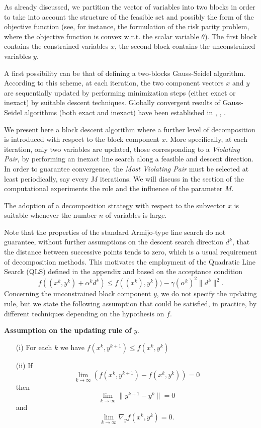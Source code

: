 As already discussed, we partition the vector of variables into two blocks in order to take into account
the structure of the feasible set and possibly the form of the objective function (see, for instance,
the formulation of the risk parity problem, where the objective function is convex w.r.t. the scalar variable $\theta$).
The first block contains the constrained variables $x$, the second block contains
the unconstrained variables $y$. 

A first possibility can be that of defining a two-blocks Gauss-Seidel algorithm.
According to this scheme, at each iteration, the two component vectors $x$ and $y$ are
sequentially updated by performing  minimization steps (either exact or inexact) by  suitable descent techniques.
Globally convergent results of Gauss-Seidel algorithms (both exact and inexact) have been established in \cite{}, \cite{}, \cite{}.

We present here a block descent algorithm where a further level of decomposition is
introduced with respect to the block component $x$. 
More specifically, at each iteration, only two variables are updated, those corresponding
to a {\it Violating Pair}, by performing an inexact line search along a feasible and descent direction.
In order to guarantee convergence, the {\it Most Violating Pair} must be selected at least periodically, say every $M$ iterations.
We will discuss in the section of the computational experiments the role and the influence of the parameter $M$.

The adoption of a decomposition strategy with respect to the subvector $x$ is suitable
whenever the number $n$ of variables is large.

Note that the properties of the standard Armijo-type line search do not guarantee, without further assumptions
on the descent search direction $d^k$, that the distance between successive points tends to zero, which is a usual requirement of decomposition methods. 
This motivates the employment of the Quadratic Line Searck (QLS) defined in the appendix and based on the acceptance condition
$$
f((x^k,y^k)+\alpha^kd^k)\le f((x^k),y^k))-\gamma (\alpha^k)^2\|d^k\|^2.
$$
Concerning the unconstrained block component $y$, we do not specify the updating rule, but we state the following assumption that
could be satisfied, in practice, by different techniques depending on the hypothesis on $f$.
\par\medskip\noindent
{\bf Assumption on the updating rule of} $y$.
\par\medskip\noindent
\begin{itemize}
\item[(i)] For each $k$ we have $f(x^k,y^{k+1})\le f(x^k,y^k)$
\item [(ii)] If
$$
\lim_{k\to\infty} \left(f(x^k,y^{k+1})- f(x^k,y^k)\right)=0
$$
then
$$
\lim_{k\to\infty}\|y^{k+1}-y^k\|=0
$$
and
$$
\lim_{k\to\infty}\nabla_y f(x^k,y^k)=0.
$$
\end{itemize}


